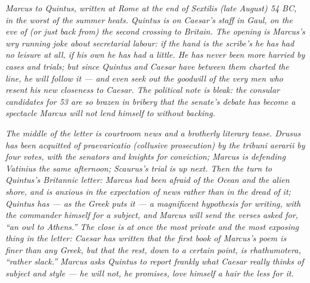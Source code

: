
\textit{Marcus to Quintus, written at Rome at the end of Sextilis
(late August) 54 BC, in the worst of the summer heats. Quintus is
on Caesar's staff in Gaul, on the eve of (or just back from) the
second crossing to Britain. The opening is Marcus's wry running
joke about secretarial labour: if the hand is the scribe's he has
had no leisure at all, if his own he has had a little. He has never
been more harried by cases and trials; but since Quintus and Caesar
have between them charted the line, he will follow it --- and even
seek out the goodwill of the very men who resent his new closeness
to Caesar. The political note is bleak: the consular candidates
for 53 are so brazen in bribery that the senate's debate has become
a spectacle Marcus will not lend himself to without backing.}

\textit{The middle of the letter is courtroom news and a brotherly
literary tease. Drusus has been acquitted of \textit{praevaricatio}
(collusive prosecution) by the tribuni aerarii by four votes, with
the senators and knights for conviction; Marcus is defending
Vatinius the same afternoon; Scaurus's trial is up next. Then the
turn to Quintus's Britannic letter: Marcus had been afraid of the
Ocean and the alien shore, and is anxious in the expectation of
news rather than in the dread of it; Quintus has --- as the Greek
puts it --- a magnificent \textit{hypothesis} for writing, with
the commander himself for a subject, and Marcus will send the verses
asked for, ``an owl to Athens.'' The close is at once the most
private and the most exposing thing in the letter: Caesar has
written that the first book of Marcus's poem is finer than any
Greek, but that the rest, down to a certain point, is
\textit{rhathumotera}, ``rather slack.'' Marcus asks Quintus to
report frankly what Caesar really thinks of subject and style ---
he will not, he promises, love himself a hair the less for it.}

